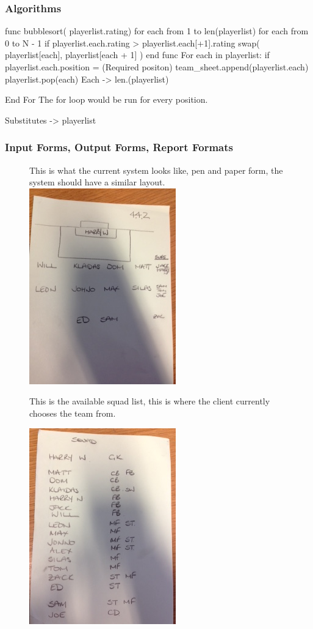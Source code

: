 \subsubsection{Algorithms}

func bubblesort( playerlist.rating)
    for each from 1 to len(playerlist)
        for each from 0 to N - 1
           if playerlist.each.rating > playerlist.each[+1].rating
              swap( playerlist[each], playerlist[each + 1] )
end func
For each in playerlist:
	if playerlist.each.position = (Required positon)\:
		team\_sheet.append(playerlist.each)
		playerlist.pop(each)
		Each -> len.(playerlist)
		
	
End For
The for loop would be run for every position.

Substitutes ->  playerlist 

\subsubsection{Input Forms, Output Forms, Report Formats}
\begin{figure}[H]
	This is what the current system looks like, pen and paper form, the system should have a similar layout.
	\includegraphics{formation}
	
	
	This is the available squad list, this is where the client currently chooses the team from. 

	\includegraphics{squad}
\end{figure}

